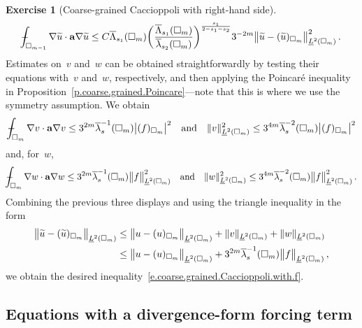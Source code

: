 \documentclass[11pt,twoside]{article} %
\let\oldsquare\square %
\renewcommand{\square}{\oldsquare}
\numberwithin{equation}{section}
\theoremstyle{definition}
\newtheorem{exercise}[theorem]{Exercise}
\renewcommand*{\tilde}{\widetilde}
\renewcommand{\a}{\mathbf{a}}
\newcommand{\cu}{\square}
\def\Xint#1{\mathchoice
{\XXint\displaystyle\textstyle{#1}}%
{\XXint\textstyle\scriptstyle{#1}}%
{\XXint\scriptstyle\scriptscriptstyle{#1}}%
{\XXint\scriptscriptstyle\scriptscriptstyle{#1}}%
\!\int}
\def\XXint#1#2#3{{\setbox0=\hbox{$#1{#2#3}{\int}$}
\vcenter{\hbox{$#2#3$}}\kern-.5\wd0}}
\def\fint{\Xint-}
\begin{document}
\begin{exercise}[Coarse-grained Caccioppoli with right-hand side]
\begin{equation*}
\fint_{\cu_{m-1}} \nabla \tilde{u} \cdot \a\nabla\tilde{u} 
\leq 
C \overline{\Lambda}_{s_1}(\cu_m) 
\biggl( \frac{\overline{\Lambda}_{s_1}(\cu_m)}{\overline{\lambda}_{s_2}(\cu_m)} \biggr)^{\frac{s_1}{2-s_1-s_2}}
3^{-2m} \bigl\| \tilde{u}-(\tilde{u} )_{\cu_m} \bigr\|_{\underline{L}^2(\cu_m)}^2
\,.
\end{equation*}
Estimates on~$v$ and~$w$ can be obtained straightforwardly by testing their equations with~$v$ and~$w$, respectively, and then applying the Poincar\'e inequality in Proposition~\ref{p.coarse.grained.Poincare}---note that this is where we use the symmetry assumption. We obtain
\begin{equation*}
\fint_{\cu_m} \nabla v \cdot \a\nabla v \leq 
3^{2m} 
\overline{\lambda}^{-1}_{s} (\cu_m) 
\bigl| (f)_{\cu_m} \bigr|^2
\quad \mbox{and} \quad
\| v \|_{\underline{L}^2(\cu_m)}^2
\leq 
3^{4m} 
\overline{\lambda}^{-2}_{s} (\cu_m) 
\bigl| (f)_{\cu_m} \bigr|^2
\end{equation*}
and, for~$w$, 
\begin{equation*}
\fint_{\cu_m} \nabla w \cdot \a\nabla w \leq 
3^{2m} 
\overline{\lambda}^{-1}_{s} (\cu_m) 
\bigl\| f \bigr\|_{\underline{L}^2(\cu_m)}^2
\quad \mbox{and} \quad
\| w \|_{\underline{L}^2(\cu_m)}^2
\leq 
3^{4m} 
\overline{\lambda}^{-2}_{s} (\cu_m) 
\bigl\| f \bigr\|_{\underline{L}^2(\cu_m)}^2
\,.
\end{equation*}
Combining the previous three displays and using the triangle inequality in the form
\begin{align*}
\bigl\| \tilde{u}-(\tilde{u} )_{\cu_m} \bigr\|_{\underline{L}^2(\cu_m)}
&
\leq 
\bigl\| u-(u )_{\cu_m} \bigr\|_{\underline{L}^2(\cu_m)}
+
\| v \|_{\underline{L}^2(\cu_m)} + \| w \|_{\underline{L}^2(\cu_m)}
\notag \\ & 
\leq
\bigl\| u-(u )_{\cu_m} \bigr\|_{\underline{L}^2(\cu_m)}
+
3^{2m} \overline{\lambda}^{-1}_{s} (\cu_m) 
\bigl\| f \bigr\|_{\underline{L}^2(\cu_m)}\,,
\end{align*}
we obtain the desired inequality~\eqref{e.coarse.grained.Caccioppoli.with.f}. 
\end{exercise} 



\subsection{Equations with a divergence-form forcing term}
\label{ss.rhs} 
\end{document}
